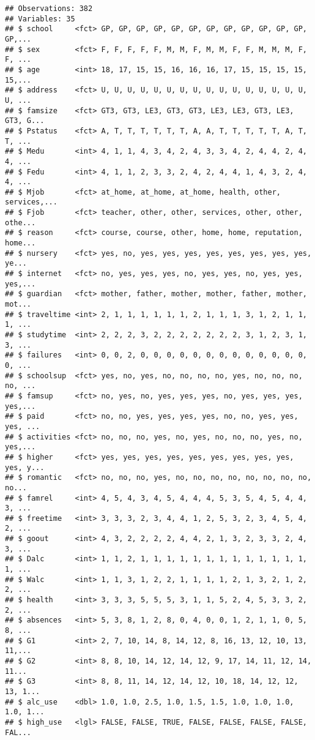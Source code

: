 \documentclass[]{article}
\begin{document}
\begin{verbatim}
## Observations: 382
## Variables: 35
## $ school     <fct> GP, GP, GP, GP, GP, GP, GP, GP, GP, GP, GP, GP, GP,...
## $ sex        <fct> F, F, F, F, F, M, M, F, M, M, F, F, M, M, M, F, F, ...
## $ age        <int> 18, 17, 15, 15, 16, 16, 16, 17, 15, 15, 15, 15, 15,...
## $ address    <fct> U, U, U, U, U, U, U, U, U, U, U, U, U, U, U, U, U, ...
## $ famsize    <fct> GT3, GT3, LE3, GT3, GT3, LE3, LE3, GT3, LE3, GT3, G...
## $ Pstatus    <fct> A, T, T, T, T, T, T, A, A, T, T, T, T, T, A, T, T, ...
## $ Medu       <int> 4, 1, 1, 4, 3, 4, 2, 4, 3, 3, 4, 2, 4, 4, 2, 4, 4, ...
## $ Fedu       <int> 4, 1, 1, 2, 3, 3, 2, 4, 2, 4, 4, 1, 4, 3, 2, 4, 4, ...
## $ Mjob       <fct> at_home, at_home, at_home, health, other, services,...
## $ Fjob       <fct> teacher, other, other, services, other, other, othe...
## $ reason     <fct> course, course, other, home, home, reputation, home...
## $ nursery    <fct> yes, no, yes, yes, yes, yes, yes, yes, yes, yes, ye...
## $ internet   <fct> no, yes, yes, yes, no, yes, yes, no, yes, yes, yes,...
## $ guardian   <fct> mother, father, mother, mother, father, mother, mot...
## $ traveltime <int> 2, 1, 1, 1, 1, 1, 1, 2, 1, 1, 1, 3, 1, 2, 1, 1, 1, ...
## $ studytime  <int> 2, 2, 2, 3, 2, 2, 2, 2, 2, 2, 2, 3, 1, 2, 3, 1, 3, ...
## $ failures   <int> 0, 0, 2, 0, 0, 0, 0, 0, 0, 0, 0, 0, 0, 0, 0, 0, 0, ...
## $ schoolsup  <fct> yes, no, yes, no, no, no, no, yes, no, no, no, no, ...
## $ famsup     <fct> no, yes, no, yes, yes, yes, no, yes, yes, yes, yes,...
## $ paid       <fct> no, no, yes, yes, yes, yes, no, no, yes, yes, yes, ...
## $ activities <fct> no, no, no, yes, no, yes, no, no, no, yes, no, yes,...
## $ higher     <fct> yes, yes, yes, yes, yes, yes, yes, yes, yes, yes, y...
## $ romantic   <fct> no, no, no, yes, no, no, no, no, no, no, no, no, no...
## $ famrel     <int> 4, 5, 4, 3, 4, 5, 4, 4, 4, 5, 3, 5, 4, 5, 4, 4, 3, ...
## $ freetime   <int> 3, 3, 3, 2, 3, 4, 4, 1, 2, 5, 3, 2, 3, 4, 5, 4, 2, ...
## $ goout      <int> 4, 3, 2, 2, 2, 2, 4, 4, 2, 1, 3, 2, 3, 3, 2, 4, 3, ...
## $ Dalc       <int> 1, 1, 2, 1, 1, 1, 1, 1, 1, 1, 1, 1, 1, 1, 1, 1, 1, ...
## $ Walc       <int> 1, 1, 3, 1, 2, 2, 1, 1, 1, 1, 2, 1, 3, 2, 1, 2, 2, ...
## $ health     <int> 3, 3, 3, 5, 5, 5, 3, 1, 1, 5, 2, 4, 5, 3, 3, 2, 2, ...
## $ absences   <int> 5, 3, 8, 1, 2, 8, 0, 4, 0, 0, 1, 2, 1, 1, 0, 5, 8, ...
## $ G1         <int> 2, 7, 10, 14, 8, 14, 12, 8, 16, 13, 12, 10, 13, 11,...
## $ G2         <int> 8, 8, 10, 14, 12, 14, 12, 9, 17, 14, 11, 12, 14, 11...
## $ G3         <int> 8, 8, 11, 14, 12, 14, 12, 10, 18, 14, 12, 12, 13, 1...
## $ alc_use    <dbl> 1.0, 1.0, 2.5, 1.0, 1.5, 1.5, 1.0, 1.0, 1.0, 1.0, 1...
## $ high_use   <lgl> FALSE, FALSE, TRUE, FALSE, FALSE, FALSE, FALSE, FAL...
\end{verbatim}
\end{document}
